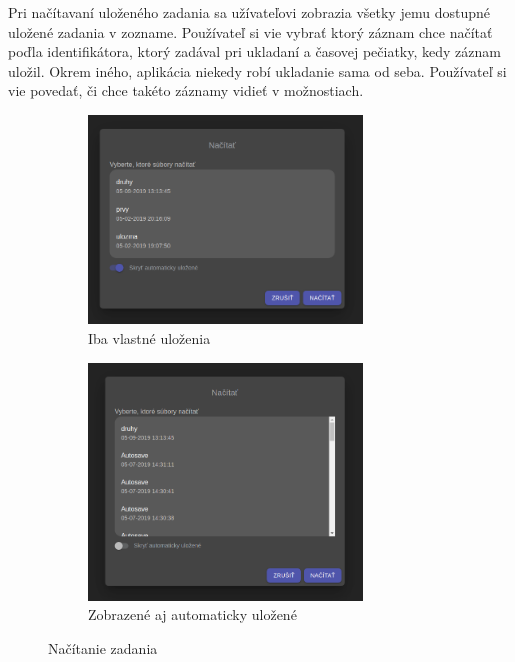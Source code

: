 Pri načítavaní uloženého zadania sa užívateľovi zobrazia všetky jemu dostupné uložené zadania v 
zozname. Používateľ si vie vybrať ktorý záznam chce načítať poďla identifikátora, ktorý zadával
pri ukladaní a časovej pečiatky, kedy záznam uložil. Okrem iného, aplikácia niekedy robí ukladanie
sama od seba. Používateľ si vie povedať, či chce takéto záznamy vidieť v možnostiach.
\begin{figure}[H]
\centering
\begin{subfigure}{.5\textwidth}
  \centering
  \includegraphics[width=0.8\textwidth]{images/nacitaj_zadanie}
  \caption[Iba vlastné uloženia]{Iba vlastné uloženia}
  \label{obr:nacitaj_zadanie}
\end{subfigure}%
\begin{subfigure}{.5\textwidth}
  \centering
  \includegraphics[width=0.8\textwidth]{images/nacitaj_automaticky_ulozene}
  \caption[Zobrazené aj automaticky uložené]{Zobrazené aj automaticky uložené}
  \label{obr:platny_nazov}
\end{subfigure}
\caption{Načítanie zadania}
\end{figure}

